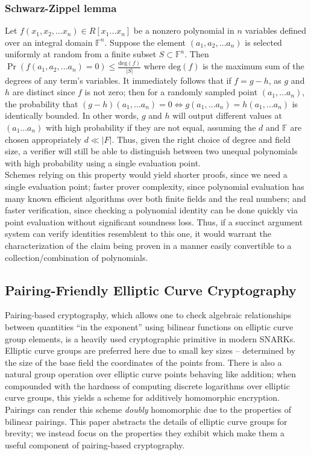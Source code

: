 \subsubsection{Schwarz-Zippel lemma}
\noindent Let $f(x_1, x_2, \dots x_n) \in R[x_1 \dots x_n]$ be a nonzero polynomial in $n$ variables defined over an integral domain $\mathbb{F}^{n}$. Suppose the element $(a_1, a_2, \dots a_n)$ is selected uniformly at random from a finite subset $S \subset \mathbb{F}^n$. Then 
$\Pr(f(a_1, a_2, \dots a_n) = 0) \le \frac{\text{deg}(f)}{|S|}$
where $\text{deg}(f)$ is the maximum sum of the degrees of any term's variables. It immediately follows that if $f = g-h$, as $g$ and $h$ are distinct since $f$ is not zero; then for a randomly sampled point $(a_1, \dots a_n)$, the probability that 
$(g-h)(a_1, \dots a_n) = 0 \Leftrightarrow g(a_1, \dots a_n) = h(a_1, \dots a_n)$
is identically bounded. In other words, $g$ and $h$ will output different values at $(a_1 \dots a_n)$ with high probability if they are not equal, assuming the $d$ and $\mathbb{F}$ are chosen appropriately $d \ll |F|$. Thus, given the right choice of degree and field size, a verifier will still be able to distinguish between two unequal polynomials with high probability using a single evaluation point.\\ 

\noindent Schemes relying on this property would yield shorter proofs, since we need a single evaluation point; faster prover complexity, since polynomial evaluation has many known efficient algorithms over both finite fields and the real numbers; and faster verification, since checking a polynomial identity can be done quickly via point evaluation without significant soundness loss. Thus, if a succinct argument system can verify identities resemblent to this one, it would warrant the characterization of the claim being proven in a manner easily convertible to a collection/combination of polynomials.

\subsection{Pairing-Friendly Elliptic Curve Cryptography}

\noindent Pairing-based cryptography, which allows one to check algebraic relationships between quantities ``in the exponent'' using bilinear functions on elliptic curve group elements, is a heavily used cryptographic primitive in modern SNARKs. Elliptic curve groups are preferred here due to small key sizes -- determined by the size of the base field the coordinates of the points from. There is also a natural group operation over elliptic curve points behaving like addition; when compounded with the hardness of computing discrete logarithms over elliptic curve groups, this yields a scheme for additively homomorphic encryption. Pairings can render this scheme \textit{doubly} homomorphic due to the properties of bilinear pairings. This paper abstracts the details of elliptic curve groups for brevity; we instead focus on the properties they exhibit which make them a useful component of pairing-based cryptography.\\

